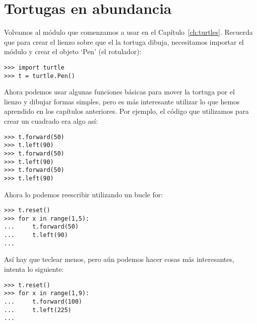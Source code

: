 

\chapter{Tortugas en abundancia}\label{ch:turtlesgalore}

Volvamos al módulo  que comenzamos a usar en el Capítulo~\ref{ch:turtles}. Recuerda que para crear el lienzo sobre que el la tortuga dibuja, necesitamos importar el módulo y crear el objeto `Pen' (el rotulador):

\begin{listing}
\begin{verbatim}
>>> import turtle
>>> t = turtle.Pen()
\end{verbatim}
\end{listing}

Ahora podemos usar algunas funciones básicas para mover la tortuga por el lienzo y dibujar formas simples, pero es más interesante utilizar lo que hemos aprendido en los capítulos anteriores.  Por ejemplo, el código que utilizamos para crear un cuadrado era algo así:

\begin{listing}
\begin{verbatim}
>>> t.forward(50)
>>> t.left(90)
>>> t.forward(50)
>>> t.left(90)
>>> t.forward(50)
>>> t.left(90)
\end{verbatim}
\end{listing} 

\noindent
Ahora lo podemos reescribir utilizando un bucle for:

\begin{listing}
\begin{verbatim}
>>> t.reset()
>>> for x in range(1,5):
...     t.forward(50)
...     t.left(90)
...
\end{verbatim}
\end{listing}

Así hay que teclear menos, pero aún podemos hacer cosas más interesantes, intenta lo siguiente:

\begin{listing}
\begin{verbatim}
>>> t.reset()
>>> for x in range(1,9):
...     t.forward(100)
...     t.left(225)
...
\end{verbatim}
\end{listing}

